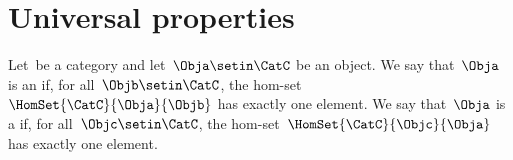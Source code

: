 
\section{Universal properties}
\publictodomessage



\begin{ctdefinition}
    \label{def:initial_terminal_object}
    Let~\CatC be a category and let~$\Obja \setin \CatC$ be an object.
    We say that~$\Obja$ is an \emph{} if, for all~$\Objb \setin\CatC$, the hom-set~$\HomSet{\CatC}{\Obja}{\Objb}$ has exactly one element.
    We say that~$\Obja$ is a \emph{} if, for all~$\Objc\setin\CatC$, the hom-set~$\HomSet{\CatC}{\Objc}{\Obja}$ has exactly one element.
\end{ctdefinition}

